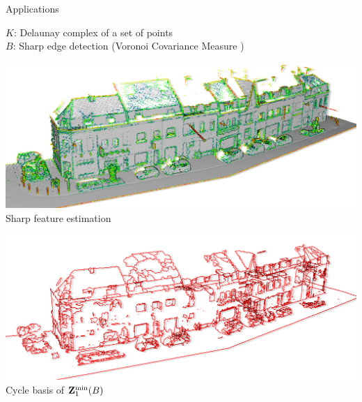 \begin{frame}{Applications}
	\scriptsize

	$K$: Delaunay complex of a set of points\\
	$B$: Sharp edge detection (Voronoi Covariance Measure \cite{merigot_VoronoiBasedCurvatureFeature_2011})\\
	
	\vspace{0.5cm}
	\pause
	\begin{minipage}{0.5\linewidth}
		\centering
		\includegraphics[width=\linewidth]{applications/lille_points}\\
		Sharp feature estimation
	\end{minipage}%
	\hfill%
	\pause%
	\begin{minipage}{0.5\linewidth}
		\centering
		\includegraphics[width=\linewidth]{applications/lille_cycles}\\
		Cycle basis of $\mathbf{Z}^{\min}_1(B)$
	\end{minipage}
	

\end{frame}
